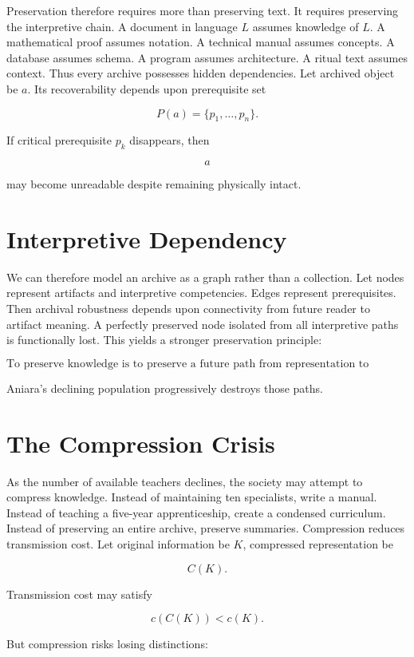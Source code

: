 \documentclass[11pt,oneside]{book}
\theoremstyle{definition}
\theoremstyle{remark}
\begin{document}
Preservation therefore requires more than preserving text. It requires preserving the interpretive
chain. A document in language \(L\) assumes knowledge of \(L\). A mathematical proof assumes
notation. A technical manual assumes concepts. A database assumes schema. A program assumes
architecture. A ritual text assumes context. Thus every archive possesses hidden dependencies. Let
archived object be \(a\). Its recoverability depends upon prerequisite set

\[
P(a)=\{p_1,\ldots,p_n\}.
\]

If critical prerequisite \(p_k\) disappears, then

\[
a
\]

may become unreadable despite remaining physically intact.

\section{Interpretive Dependency}

We can therefore model an archive as a graph rather than a collection. Let nodes represent artifacts
and interpretive competencies. Edges represent prerequisites. Then archival robustness depends upon
connectivity from future reader to artifact meaning. A perfectly preserved node isolated from all
interpretive paths is functionally lost. This yields a stronger preservation principle:

\[
\boxed{ \text{To preserve knowledge is to preserve a future path from representation to understanding.} }
\]

Aniara's declining population progressively destroys those paths.

\section{The Compression Crisis}

As the number of available teachers declines, the society may attempt to compress knowledge. Instead
of maintaining ten specialists, write a manual. Instead of teaching a five-year apprenticeship,
create a condensed curriculum. Instead of preserving an entire archive, preserve summaries.
Compression reduces transmission cost. Let original information be \(K\), compressed representation
be

\[
C(K).
\]

Transmission cost may satisfy

\[
c(C(K))<c(K).
\]

But compression risks losing distinctions:
\end{document}
